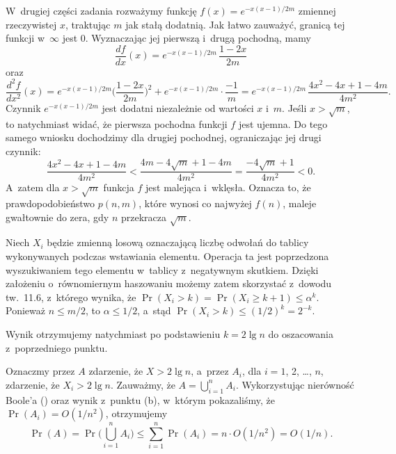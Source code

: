 W~drugiej części zadania rozważymy funkcję $f(x)=e^{-x(x-1)/2m}$ zmiennej rzeczywistej $x$, traktując $m$ jak stałą dodatnią.
Jak łatwo zauważyć, granicą tej funkcji w~$\infty$ jest 0.
Wyznaczając jej pierwszą i~drugą pochodną, mamy
\[
	\frac{df}{dx}(x) = e^{-x(x-1)/2m}\,\frac{1-2x}{2m}
\]
oraz
\[
	\frac{d^2\!f}{dx^2}(x) = e^{-x(x-1)/2m}\biggl(\frac{1-2x}{2m}\biggr)^2+e^{-x(x-1)/2m}\cdot\frac{-1}{m} = e^{-x(x-1)/2m}\,\frac{4x^2-4x+1-4m}{4m^2}.
\]
Czynnik $e^{-x(x-1)/2m}$ jest dodatni niezależnie od wartości $x$ i~$m$.
Jeśli $x>\sqrt{m}$, to natychmiast widać, że pierwsza pochodna funkcji $f$ jest ujemna.
Do tego samego wniosku dochodzimy dla drugiej pochodnej, ograniczając jej drugi czynnik:
\[
	\frac{4x^2-4x+1-4m}{4m^2} < \frac{4m-4\sqrt{m}+1-4m}{4m^2} = \frac{-4\sqrt{m}+1}{4m^2} < 0.
\]
A~zatem dla $x>\sqrt{m}$ funkcja $f$ jest malejąca i~wklęsła.
Oznacza to, że prawdopodobieństwo $p(n,m)$, które wynosi co najwyżej $f(n)$, maleje gwałtownie do zera, gdy $n$ przekracza $\sqrt{m}$.

\problems


\subproblem %
Niech $X_i$ będzie zmienną losową oznaczającą liczbę odwołań do tablicy wykonywanych podczas wstawiania  elementu.
Operacja ta jest poprzedzona wyszukiwaniem tego elementu w~tablicy z~negatywnym skutkiem.
Dzięki założeniu o~równomiernym haszowaniu możemy zatem skorzystać z~dowodu tw.\ 11.6, z~którego wynika, że $\Pr(X_i>k)=\Pr(X_i\ge k+1)\le\alpha^k$.
Ponieważ $n\le m/2$, to $\alpha\le1/2$, a~stąd $\Pr(X_i>k)\le(1/2)^k=2^{-k}$.

\subproblem %
Wynik otrzymujemy natychmiast po podstawieniu $k=2\lg n$ do oszacowania z~poprzedniego punktu.

\subproblem %
Oznaczmy przez $A$ zdarzenie, że $X>2\lg n$, a~przez $A_i$, dla $i=1$, 2, \dots, $n$, zdarzenie, że $X_i>2\lg n$.
Zauważmy, że $A=\bigcup_{i=1}^nA_i$.
Wykorzystując nierówność Boole'a () oraz wynik z~punktu (b), w~którym pokazaliśmy, że $\Pr(A_i)=O(1/n^2)$, otrzymujemy
\[
	\Pr(A) = \Pr\biggl(\bigcup_{i=1}^nA_i\biggr) \le \sum_{i=1}^n\Pr(A_i) = n\cdot O(1/n^2) = O(1/n).
\]

